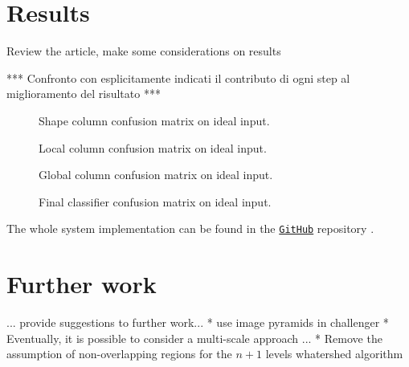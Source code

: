 \section{Results}\label{section:results}
    Review the article, make some considerations on results

    *** Confronto con esplicitamente indicati il contributo di ogni step al miglioramento del risultato ***

    \begin{figure}
        \centering
        \caption{Shape column confusion matrix on ideal input.}\label{fig:shape-confusion}
    \end{figure}

    \begin{figure}
        \centering
        \caption{Local column confusion matrix on ideal input.}\label{fig:local-confusion}
    \end{figure}

    \begin{figure}
        \centering
        \caption{Global column confusion matrix on ideal input.}\label{fig:global-confusion}
    \end{figure}

    \begin{figure}
        \centering
        \caption{Final classifier confusion matrix on ideal input.}\label{fig:final-classifier-confusion}
    \end{figure}

    The whole system implementation can be found in the \href{https://github.com/antonioterpin/wavelet_ml}{\texttt{GitHub}} repository \cite{antonioterpin:github}.


\section{Further work}\label{section:further-work}
    ...  provide suggestions to further work...
    * use image pyramids in challenger
    * Eventually, it is possible to consider a multi-scale approach ...
    * Remove the assumption of non-overlapping regions for the $n+1$ levels whatershed algorithm